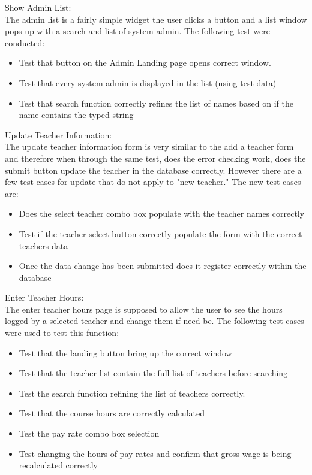 Show Admin List:\\
The admin list is a fairly simple widget the user clicks a button and a list window pops up with a search and list of system admin. The following test were conducted:

\begin{itemize}
\item Test that button on the Admin Landing page opens correct window.
\item Test that every system admin is displayed in the list (using test data)
\item Test that search function correctly refines the list of names based on if the name contains the typed string
\end{itemize}

Update Teacher Information:\\
The update teacher information form is very similar to the add a teacher form and therefore when through the same test, does the error checking work, does the submit button update the teacher in the database correctly. However there are a few test cases for update that do not apply to "new teacher." The new test cases are:

\begin{itemize}
\item Does the select teacher combo box populate with the teacher names correctly
\item Test if the teacher select button correctly populate the form with the correct teachers data
\item Once the data change has been submitted does it register correctly within the database
\end{itemize}

Enter Teacher Hours:\\
The enter teacher hours page is supposed to allow the user to see the hours logged by a selected teacher and change them if need be. The following test cases were used to test this function:

\begin{itemize}
\item Test that the landing button bring up the correct window
\item Test that the teacher list contain the full list of teachers before searching
\item Test the search function refining the list of teachers correctly.
\item Test that the course hours are correctly calculated
\item Test the pay rate combo box selection
\item Test changing the hours of pay rates and confirm that gross wage is being recalculated correctly
\end{itemize} 

